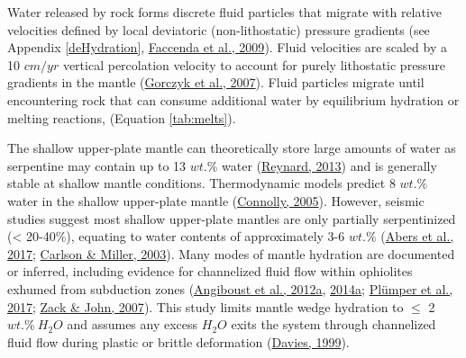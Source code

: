 Water released by rock forms discrete fluid particles that migrate with relative velocities defined by local deviatoric (non-lithostatic) pressure gradients (see Appendix \ref{deHydration}, \protect\hyperlink{ref-faccenda2009}{Faccenda et al., 2009}). Fluid velocities are scaled by a 10 \(cm/yr\) vertical percolation velocity to account for purely lithostatic pressure gradients in the mantle (\protect\hyperlink{ref-gorczyk2007}{Gorczyk et al., 2007}). Fluid particles migrate until encountering rock that can consume additional water by equilibrium hydration or melting reactions, (Equation \ref{tab:melts}).

The shallow upper-plate mantle can theoretically store large amounts of water as serpentine may contain up to 13 \(wt.\%\) water (\protect\hyperlink{ref-reynard2013}{Reynard, 2013}) and is generally stable at shallow mantle conditions. Thermodynamic models predict 8 \(wt.\%\) water in the shallow upper-plate mantle (\protect\hyperlink{ref-connolly2005}{Connolly, 2005}). However, seismic studies suggest most shallow upper-plate mantles are only partially serpentinized (\textless{} 20-40\%), equating to water contents of approximately 3-6 \(wt.\%\) (\protect\hyperlink{ref-abers2017}{Abers et al., 2017}; \protect\hyperlink{ref-carlson2003}{Carlson \& Miller, 2003}). Many modes of mantle hydration are documented or inferred, including evidence for channelized fluid flow within ophiolites exhumed from subduction zones (\protect\hyperlink{ref-angiboust2012a}{Angiboust et al., 2012a}, \protect\hyperlink{ref-angiboust2014a}{2014a}; \protect\hyperlink{ref-plumper2017}{Plümper et al., 2017}; \protect\hyperlink{ref-zack2007}{Zack \& John, 2007}). This study limits mantle wedge hydration to \(\leq\) 2 \(wt.\%~H_{2}O\) and assumes any excess \(H_{2}O\) exits the system through channelized fluid flow during plastic or brittle deformation (\protect\hyperlink{ref-davies1999}{Davies, 1999}).

